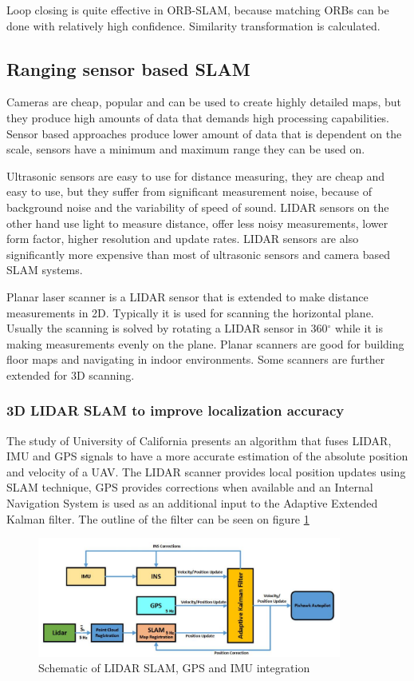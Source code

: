 Loop closing is quite effective in ORB-SLAM, because matching ORBs can be done with relatively high confidence. Similarity 
transformation is calculated.

\subsection{Ranging sensor based SLAM}
Cameras are cheap, popular and can be used to create highly detailed maps, but they produce high amounts of data that demands 
high processing capabilities. Sensor based approaches produce lower amount of data that is dependent on the scale, sensors have
a minimum and maximum range they can be used on.

Ultrasonic sensors are easy to use for distance measuring, they are cheap and easy to use, but they suffer from significant
measurement noise, because of background noise and the variability of speed of sound. LIDAR sensors on the other hand 
use light to measure distance, offer less noisy measurements, lower form factor, higher resolution and update rates. LIDAR 
sensors are also significantly more expensive than most of ultrasonic sensors and camera based SLAM systems.

Planar laser scanner is a LIDAR sensor that is extended to make distance measurements in 2D. Typically it is used for 
scanning the horizontal plane. Usually the scanning is solved by rotating a LIDAR sensor in 360$^\circ$ while it is 
making measurements evenly on the plane. Planar scanners are good for building floor maps and navigating in indoor 
environments. Some scanners are further extended for 3D scanning.


\subsubsection{3D LIDAR SLAM to improve localization accuracy}

The study of University of California\cite{hening20173d} presents an algorithm that fuses LIDAR, IMU and GPS signals 
to have a more accurate estimation of the absolute position and velocity of a UAV. The LIDAR scanner provides local position
updates using SLAM technique, GPS provides corrections when available and an Internal Navigation System is used as an 
additional input to the Adaptive Extended Kalman filter. The outline of the filter can be seen on figure \ref{fig:haning_filter}

\begin{figure}[!ht]
    \centering
	\includegraphics[width=100mm, keepaspectratio]{figures/hening_filter.png}
    \caption{Schematic of LIDAR SLAM, GPS and IMU integration \cite{hening20173d}}
    \label{fig:haning_filter}
\end{figure}

